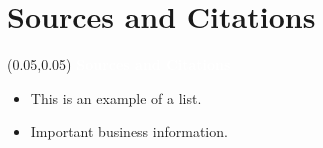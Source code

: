 \documentclass[aspectratio=169]{beamer} %
\begin{document}
\section{Sources and Citations}

\begin{frame}{}
    \setlength{\TPHorizModule}{\textwidth}
    \setlength{\TPVertModule}{\textwidth}
    \begin{textblock}{0.74}(0.05,0.05)
        \bfseries\large\textcolor{white}{Sources and Citations}
    \end{textblock}
    \begin{itemize}
        \item This is an example of a list.
        \item Important business information.
    \end{itemize}
\end{frame}
\end{document}
